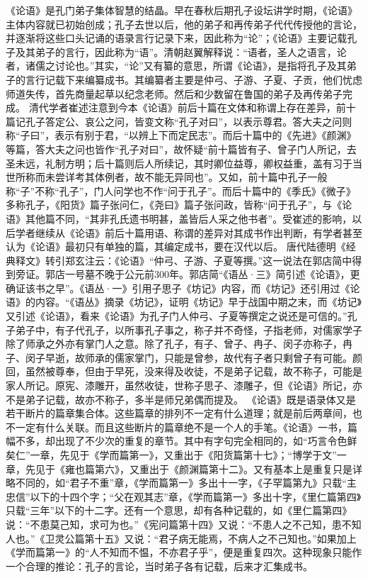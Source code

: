 \documentclass[a4paper,12pt,UTF8,twoside]{ctexbook}
\begin{document}
《论语》是孔门弟子集体智慧的结晶。早在春秋后期孔子设坛讲学时期，《论语》主体内容就已初始创成；孔子去世以后，他的弟子和再传弟子代代传授他的言论，并逐渐将这些口头记诵的语录言行记录下来，因此称为“论”；《论语》主要记载孔子及其弟子的言行，因此称为“语”。清朝赵翼解释说：“语者，圣人之语言，论者，诸儒之讨论也。”其实，“论”又有纂的意思，所谓《论语》，是指将孔子及其弟子的言行记载下来编纂成书。其编纂者主要是仲弓、子游、子夏、子贡，他们忧虑师道失传，首先商量起草以纪念老师。然后和少数留在鲁国的弟子及再传弟子完成。
清代学者崔述注意到今本《论语》前后十篇在文体和称谓上存在差异，前十篇记孔子答定公、哀公之问，皆变文称“孔子对曰”，以表示尊君。答大夫之问则称“子曰”，表示有别于君，“以辨上下而定民志”。而后十篇中的《先进》《颜渊》等篇，答大夫之问也皆作“孔子对曰”，故怀疑“前十篇皆有子、曾子门人所记，去圣未远，礼制方明；后十篇则后人所续记，其时卿位益尊，卿权益重，盖有习于当世所称而未尝详考其体例者，故不能无异同也”。又如，前十篇中孔子一般称“子”不称“孔子”，门人问学也不作“问于孔子”。而后十篇中的《季氏》《微子》多称孔子，《阳货》篇子张问仁，《尧曰》篇子张问政，皆称“问于孔子”，与《论语》其他篇不同，“其非孔氏遗书明甚，盖皆后人采之他书者”。受崔述的影响，以后学者继续从《论语》前后十篇用语、称谓的差异对其成书作出判断，有学者甚至认为《论语》最初只有单独的篇，其编定成书，要在汉代以后。
唐代陆德明《经典释文》转引郑玄注云：《论语》“仲弓、子游、子夏等撰。”这一说法在郭店简中得到旁证。郭店一号墓不晚于公元前300年。郭店简“《语丛·三》简引述《论语》，更确证该书之早”。《语丛·一》引用子思子《坊记》内容，而《坊记》还引用过《论语》的内容。“《语丛》摘录《坊记》，证明《坊记》早于战国中期之末，而《坊记》又引述《论语》，看来《论语》为孔子门人仲弓、子夏等撰定之说还是可信的。”孔子弟子中，有子代孔子，以所事孔子事之，称子并不奇怪，子指老师，对儒家学子除了师承之外亦有掌门人之意。除了孔子，有子、曾子、冉子、闵子亦称子，冉子、闵子早逝，故师承的儒家掌门，只能是曾参，故代有子者只剩曾子有可能。颜回，虽然被尊奉，但由于早死，没来得及收徒，不是弟子记载，故不称子，可能是家人所记。原宪、漆雕开，虽然收徒，世称子思子、漆雕子，但《论语》所记，亦不是弟子记载，故亦不称子，多半是师兄弟偶而提及。
《论语》既是语录体又是若干断片的篇章集合体。这些篇章的排列不一定有什么道理；就是前后两章间，也不一定有什么关联。而且这些断片的篇章绝不是一个人的手笔。《论语》一书，篇幅不多，却出现了不少次的重复的章节。其中有字句完全相同的，如“巧言令色鲜矣仁”一章，先见于《学而篇第一》，又重出于《阳货篇第十七》；“博学于文”一章，先见于《雍也篇第六》，又重出于《颜渊篇第十二》。又有基本上是重复只是详略不同的，如“君子不重”章，《学而篇第一》多出十一字，《子罕篇第九》只载“主忠信”以下的十四个字；“父在观其志”章，《学而篇第一》多出十字，《里仁篇第四》只载“三年”以下的十二字。还有一个意思，却有各种记载的，如《里仁篇第四》说：“不患莫己知，求可为也。”《宪问篇第十四》又说：“不患人之不己知，患不知人也。”《卫灵公篇第十五》又说：“君子病无能焉，不病人之不己知也。”如果加上《学而篇第一》的“人不知而不愠，不亦君子乎”，便是重复四次。这种现象只能作一个合理的推论：孔子的言论，当时弟子各有记载，后来才汇集成书。
\end{document}
